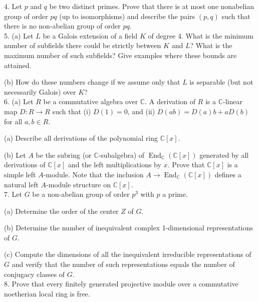 \documentclass[11pt]{article}
\newcommand{\C}{\mathbb{C}}
\DeclareMathOperator{\End}{End}
\begin{document}
4. Let $p$ and $q$ be two distinct primes. Prove that there is at most one nonabelian
group of order $pq$ (up to isomorphisms) and describe the pairs $(p, q)$ such
that there is no non-abelian group of order $pq$.\\

5. (a) Let $L$ be a Galois extension of a field $K$ of degree 4. What is the minimum
number of subfields there could be strictly between $K$ and $L$? What is the maximum
number of such subfields? Give examples where these bounds are attained.

(b) How do these numbers change if we assume only that $L$ is separable (but not
necessarily Galois) over $K$?\\

6. (a) Let $R$ be a commutative algebra over $\C$. A derivation of $R$ is a $\C$-linear map $D:R\to R$ such that (i) $D(1) = 0$, and (ii) $D(ab) = D(a)b + aD(b)$ for all $a,b\in R$.

(a) Describe all derivations of the polynomial ring $\C[x]$.

(b) Let $A$ be the subring (or $\C$-subalgebra) of $\End_\C(\C[x])$ generated by all derivations of $\C[x]$ and the left multiplications by $x$. Prove that $\C[x]$ is a simple left $A$-module. Note that the inclusion $A\to \End_\C(\C[x])$ defines a natural left $A$-module structure on $\C[x]$. \\


7. Let $G$ be a non-abelian group of order $p^3$ with $p$ a prime.

(a) Determine the order of the center $Z$ of $G$.

(b) Determine the number of inequivalent complex 1-dimensional representations of $G$. 

(c) Compute the dimensions of all the inequivalent irreducible representations of $G$ and verify that the number of such representations equals the number of conjugacy classes of $G$. \\

8.  Prove that every finitely generated projective module over a commutative
noetherian local ring is free.
\end{document}
